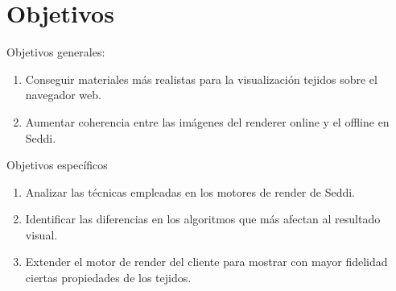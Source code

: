 \chapter{Objetivos}

Objetivos generales:
\begin{enumerate}
    \item Conseguir materiales m\'as realistas para la visualizaci\'on tejidos sobre el navegador web.
    \item Aumentar coherencia entre las im\'agenes del renderer online y el offline en Seddi.
\end{enumerate}

Objetivos espec\'ificos
\begin{enumerate}
    \item Analizar las t\'ecnicas empleadas en los motores de render de Seddi. 
    \item Identificar las diferencias en los algoritmos que m\'as afectan al resultado visual.
    \item Extender el motor de render del cliente para mostrar con mayor fidelidad ciertas propiedades
          de los tejidos.
  \end{enumerate}
